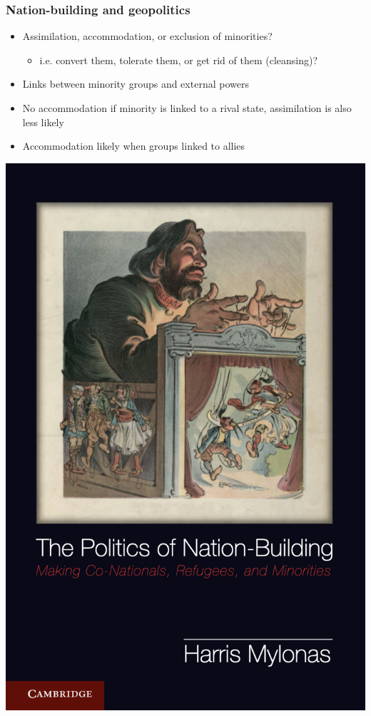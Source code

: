 \documentclass[aspectratio=43]{beamer}
\begin{document}
\begin{frame}
\frametitle{Nation-building and geopolitics}
\centering

\begin{minipage}{.49\textwidth}\centering
  \begin{itemize}
    \item Assimilation, accommodation, or exclusion of minorities?
    \begin{itemize}
      \item i.e. convert them, tolerate them, or get rid of them (cleansing)?
    \end{itemize}
    \item Links between minority groups and external powers
    \item No accommodation if minority is linked to a rival state, assimilation is also less likely
    \item Accommodation likely when groups linked to allies
  \end{itemize}
\end{minipage}\hfill
\begin{minipage}{.49\textwidth}\centering
    \includegraphics[width = .9\textwidth]{img/mylonas}
      
\end{minipage}
  

\end{frame}
  
\end{document}
